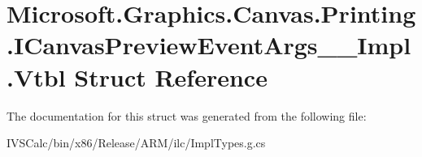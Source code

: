 \hypertarget{struct_microsoft_1_1_graphics_1_1_canvas_1_1_printing_1_1_i_canvas_preview_event_args_____impl_1_1_vtbl}{}\section{Microsoft.\+Graphics.\+Canvas.\+Printing.\+I\+Canvas\+Preview\+Event\+Args\+\_\+\+\_\+\+Impl.\+Vtbl Struct Reference}
\label{struct_microsoft_1_1_graphics_1_1_canvas_1_1_printing_1_1_i_canvas_preview_event_args_____impl_1_1_vtbl}


The documentation for this struct was generated from the following file\+:\begin{DoxyCompactItemize}
\item 
I\+V\+S\+Calc/bin/x86/\+Release/\+A\+R\+M/ilc/Impl\+Types.\+g.\+cs\end{DoxyCompactItemize}
